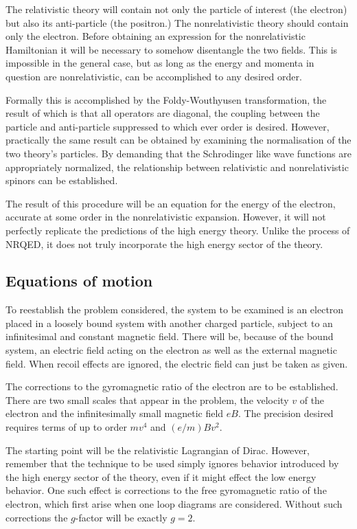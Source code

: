 The relativistic theory will contain not only the particle of interest (the electron) but also its anti-particle (the positron.)  The nonrelativistic theory should contain only the electron.  Before obtaining an expression for the nonrelativistic Hamiltonian it will be necessary to somehow disentangle the two fields.  This is impossible in the general case, but as long as the energy and momenta in question are nonrelativistic, can be accomplished to any desired order.

Formally this is accomplished by the Foldy-Wouthyusen transformation, the result of which is that all operators are diagonal, the coupling between the particle and anti-particle suppressed to which ever order is desired.  However, practically the same result can be obtained by examining the normalisation of the two theory's particles.  By demanding that the Schrodinger like wave functions are appropriately normalized, the relationship between relativistic and nonrelativistic spinors can be established.

The result of this procedure will be an equation for the energy of the electron, accurate at some order in the nonrelativistic expansion.  However, it will not perfectly replicate the predictions of the high energy theory.  Unlike the process of NRQED, it does not truly incorporate the high energy sector of the theory.



\subsection{Equations of motion}

To reestablish the problem considered, the system to be examined is an electron placed in a loosely bound system with another charged particle, subject to an infinitesimal and constant magnetic field.  There will be, because of the bound system, an electric field acting on the electron as well as the external magnetic field.  When recoil effects are ignored, the electric field can just be taken as given.

The corrections to the gyromagnetic ratio of the electron are to be established.  There are two small scales that appear in the problem, the velocity $v$ of the electron and the infinitesimally small magnetic field $eB$.  The precision desired requires terms of up to order $mv^4$ and $ (e/m)Bv^2$.

The starting point will be the relativistic Lagrangian of Dirac.  However, remember that the technique to be used simply ignores behavior introduced by the high energy sector of the theory, even if it might effect the low energy behavior.  One such effect is corrections to the free gyromagnetic ratio of the electron, which first arise when one loop diagrams are considered.  Without such corrections the $g$-factor will be exactly $g=2$.

